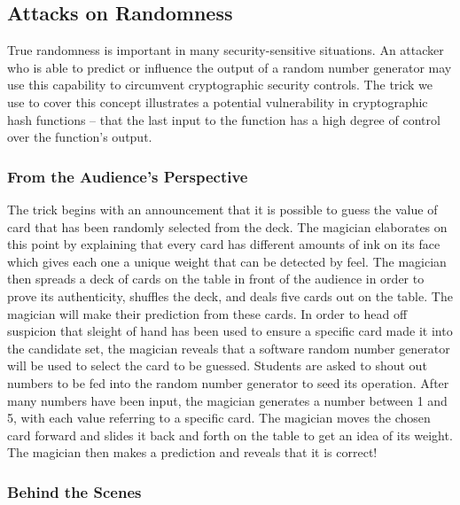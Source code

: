 \subsection{Attacks on Randomness}


True randomness is important in many
security-sensitive situations.
An attacker who is able to predict or influence the output of a random number
generator may use this capability to circumvent cryptographic security controls.
The trick we use to cover this concept
illustrates a potential vulnerability in cryptographic hash functions
-- that the last input to the function has a high degree of control over
the function's output.


\subsubsection{From the Audience's Perspective}

The trick begins with an announcement that it is possible to
guess the value of card that
has been randomly selected from the deck.
The magician elaborates on this point by
explaining that every
card has different amounts of ink on its face which gives each one a unique
weight that can be detected by feel.
The magician then spreads a deck of cards on the table
in front of the
audience in order to prove its authenticity,
shuffles the deck,
and deals five cards out on the table.
The magician will make their prediction from these cards.
In order to head off suspicion that sleight of hand has been used to ensure
a specific card made it into the candidate set, the magician reveals that
a software random number generator will be used to select the card to be
guessed.
Students are asked to shout out numbers to be fed into the random number
generator to seed its operation.  After many numbers have been input, the
magician generates a number between 1 and 5, with each value referring to a
specific card.  The magician moves the chosen card forward and slides it back
and forth on the table to get an idea of its weight.  The magician then makes
a prediction and reveals that it is correct!

\subsubsection{Behind the Scenes}

